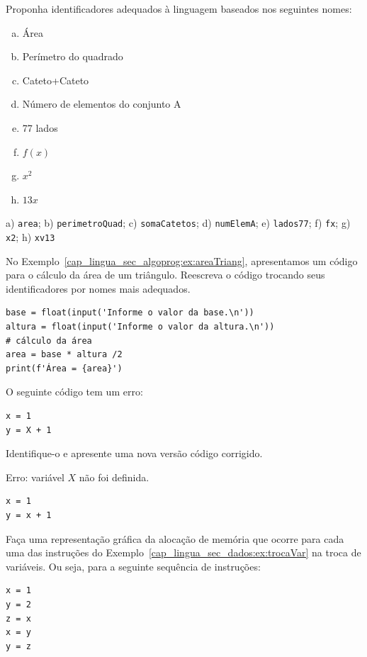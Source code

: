 \begin{exer}
  Proponha identificadores adequados à linguagem {\python} baseados nos seguintes nomes:
  \begin{enumerate}[a)]
  \item Área
  \item Perímetro do quadrado
  \item Cateto+Cateto
  \item Número de elementos do conjunto A
  \item 77 lados
  \item $f(x)$
  \item $x^2$
  \item $13x$
  \end{enumerate}
\end{exer}
\begin{resp}
  a) \lstinline+area+; b) \lstinline+perimetroQuad+; c) \lstinline+somaCatetos+; d) \lstinline+numElemA+; e) \lstinline+lados77+; f) \lstinline+fx+; g) \lstinline+x2+; h) \lstinline+xv13+
\end{resp}

\begin{exer}
  No Exemplo~\ref{cap_lingua_sec_algoprog:ex:areaTriang}, apresentamos um código {\python} para o cálculo da área de um triângulo. Reescreva o código trocando seus identificadores por nomes mais adequados.
\end{exer}
\begin{resp}
\begin{lstlisting}
base = float(input('Informe o valor da base.\n'))
altura = float(input('Informe o valor da altura.\n'))
# cálculo da área
area = base * altura /2
print(f'Área = {area}')
\end{lstlisting}
\end{resp}

\begin{exer}
  O seguinte código {\python} tem um erro:
\begin{lstlisting}
x = 1
y = X + 1
\end{lstlisting}
  Identifique-o e apresente uma nova versão código corrigido.
\end{exer}
\begin{resp}
  Erro: variável $X$ não foi definida.
\begin{lstlisting}
x = 1
y = x + 1
\end{lstlisting}
\end{resp}

\begin{exer}
  Faça uma representação gráfica da alocação de memória que ocorre para cada uma das instruções {\python} do Exemplo~\ref{cap_lingua_sec_dados:ex:trocaVar} na troca de variáveis. Ou seja, para a seguinte sequência de instruções:
\begin{lstlisting}
x = 1
y = 2
z = x
x = y
y = z
\end{lstlisting}
\end{exer}

